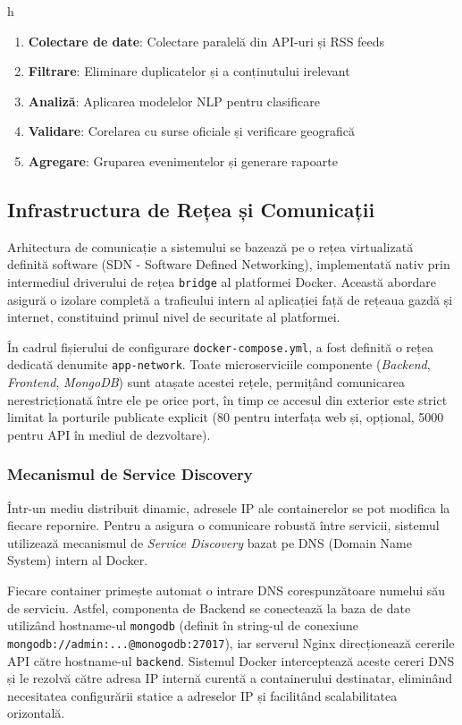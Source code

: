 h\documentclass[12pt,a4paper]{article}
\begin{document}
\begin{enumerate}
    \item \textbf{Colectare de date}: Colectare paralelă din API-uri și RSS feeds
    \item \textbf{Filtrare}: Eliminare duplicatelor și a conținutului irelevant
    \item \textbf{Analiză}: Aplicarea modelelor NLP pentru clasificare
    \item \textbf{Validare}: Corelarea cu surse oficiale și verificare geografică
    \item \textbf{Agregare}: Gruparea evenimentelor și generare rapoarte
\end{enumerate}


\subsection{Infrastructura de Rețea și Comunicații}
\label{subsec:retea}

\hspace{1em} Arhitectura de comunicație a sistemului se bazează pe o rețea virtualizată definită software (SDN - Software Defined Networking), implementată nativ prin intermediul driverului de rețea \texttt{bridge} al platformei Docker. Această abordare asigură o izolare completă a traficului intern al aplicației față de rețeaua gazdă și internet, constituind primul nivel de securitate al platformei. 

În cadrul fișierului de configurare \texttt{docker-compose.yml}, a fost definită o rețea dedicată denumite \texttt{app-network}. Toate microserviciile componente (\textit{Backend}, \textit{Frontend}, \textit{MongoDB}) sunt atașate acestei rețele, permițând comunicarea nerestricționată între ele pe orice port, în timp ce accesul din exterior este strict limitat la porturile publicate explicit (80 pentru interfața web și, opțional, 5000 pentru API în mediul de dezvoltare). 

\subsubsection{Mecanismul de Service Discovery}
\hspace{1em} Într-un mediu distribuit dinamic, adresele IP ale containerelor se pot modifica la fiecare repornire. Pentru a asigura o comunicare robustă între servicii, sistemul utilizează mecanismul de \textit{Service Discovery} bazat pe DNS (Domain Name System) intern al Docker. 

Fiecare container primește automat o intrare DNS corespunzătoare numelui său de serviciu. Astfel, componenta de Backend se conectează la baza de date utilizând hostname-ul \texttt{mongodb} (definit în string-ul de conexiune \texttt{mongodb://admin:...@monogodb:27017}), iar serverul Nginx direcționează cererile API către hostname-ul \texttt{backend}. Sistemul Docker interceptează aceste cereri DNS și le rezolvă către adresa IP internă curentă a containerului destinatar, eliminând necesitatea configurării statice a adreselor IP și facilitând scalabilitatea orizontală. 
\end{document}
